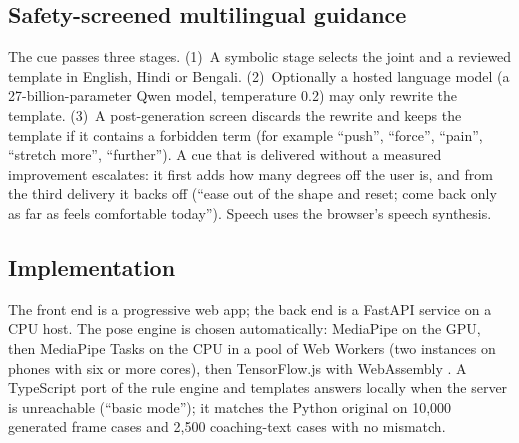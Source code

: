 \subsection{Safety-screened multilingual guidance}\label{sec:safety}
The cue passes three stages. (1)~A symbolic stage selects the joint and a reviewed template in English, Hindi or Bengali. (2)~Optionally a hosted language model (a 27-billion-parameter Qwen model, temperature 0.2) may only rewrite the template. (3)~A post-generation screen discards the rewrite and keeps the template if it contains a forbidden term (for example ``push'', ``force'', ``pain'', ``stretch more'', ``further''). A cue that is delivered without a measured improvement escalates: it first adds how many degrees off the user is, and from the third delivery it backs off (``ease out of the shape and reset; come back only as far as feels comfortable today''). Speech uses the browser's speech synthesis.

\subsection{Implementation}
The front end is a progressive web app; the back end is a FastAPI service on a CPU host. The pose engine is chosen automatically: MediaPipe on the GPU, then MediaPipe Tasks on the CPU in a pool of Web Workers (two instances on phones with six or more cores), then TensorFlow.js with WebAssembly \cite{smilkov2019tfjs}. A TypeScript port of the rule engine and templates answers locally when the server is unreachable (``basic mode''); it matches the Python original on 10{,}000 generated frame cases and 2{,}500 coaching-text cases with no mismatch.
